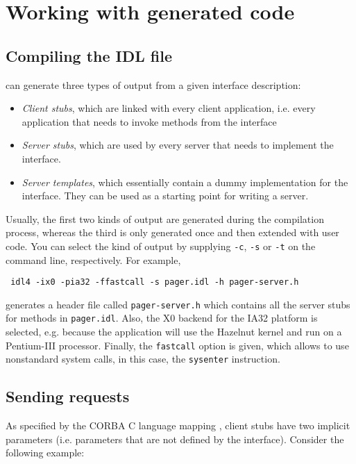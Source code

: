 \chapter{Working with generated code}

\section{Compiling the IDL file}

\IDL can generate three types of output from a given interface description:

\begin{itemize}
\item \emph{Client stubs}, which are linked with every client application,
i.e. every application that needs to invoke methods from the interface
\item \emph{Server stubs}, which are used by every server that needs to
implement the interface.
\item \emph{Server templates}, which essentially contain a dummy implementation
for the interface. They can be used as a starting point for writing a server.
\end{itemize}

Usually, the first two kinds of output are generated during the compilation
process, whereas the third is only generated once and then extended with
user code. You can select the kind of output by supplying \texttt{-c},
\texttt{-s} or \texttt{-t} on the command line, respectively. For example,

\begin{center}\texttt{
idl4 -ix0 -pia32 -ffastcall -s pager.idl -h pager-server.h
}\end{center}

generates a header file called \texttt{pager-server.h} which contains all
the server stubs for methods in \texttt{pager.idl}. Also, the X0 backend
for the IA32 platform is selected, e.g. because the application will use
the Hazelnut kernel and run on a Pentium-III processor. Finally, the
\texttt{fastcall} option is given, which allows \IDL to use nonstandard
system calls, in this case, the \texttt{sysenter} instruction.

\section{Sending requests}

As specified by the CORBA C language mapping \cite{corba-clm}, client stubs
have two implicit parameters (i.e. parameters that are not defined by
the interface). Consider the following example:

